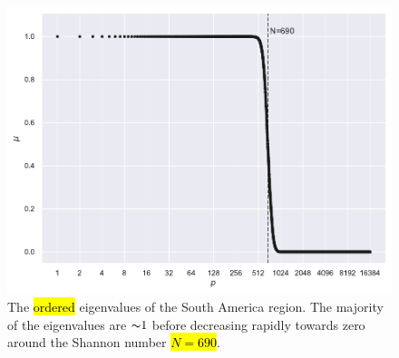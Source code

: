 \begin{figure}[htpb]
	\centering\capstart{}
	\includegraphics[width=\textwidth]{south_america_eigenvalues_L128.pdf}
	\caption[
		The Slepian eigenvalues of the South America region
	]{
		The \hl{ordered} eigenvalues of the South America region.
		The majority of the eigenvalues are \({\thicksim}\num{1}\) before decreasing rapidly towards zero around the Shannon number \hl{\mbox{\(N=690\)}}.
	}\label{fig:chapter4_eigenvalues}
\end{figure}
